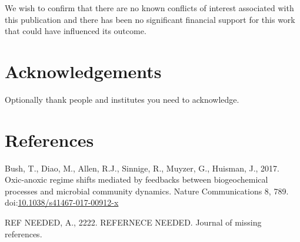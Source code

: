 \documentclass[]{elsarticle} %
\newlength{\cslhangindent}
\newlength{\cslentryspacingunit} %
\newenvironment{CSLReferences}[2] %
 {%
  \setlength{\parindent}{0pt}
  \ifodd #1
  \let\oldpar\par
  \def\par{\hangindent=\cslhangindent\oldpar}
  \fi
  \setlength{\parskip}{#2\cslentryspacingunit}
 }%
 {}
\begin{document}
We wish to confirm that there are no known conflicts of interest
associated with this publication and there has been no significant
financial support for this work that could have influenced its outcome.

\hypertarget{acknowledgements}{%
\section{Acknowledgements}\label{acknowledgements}}

Optionally thank people and institutes you need to acknowledge.

\hypertarget{references}{%
\section*{References}\label{references}}

\hypertarget{refs}{}
\begin{CSLReferences}{1}{0}
\leavevmode{}%
Bush, T., Diao, M., Allen, R.J., Sinnige, R., Muyzer, G., Huisman, J.,
2017. Oxic-anoxic regime shifts mediated by feedbacks between
biogeochemical processes and microbial community dynamics. Nature
Communications 8, 789.
doi:\href{https://doi.org/10.1038/s41467-017-00912-x}{10.1038/s41467-017-00912-x}

\leavevmode{}%
REF NEEDED, A., 2222. {REFERNECE NEEDED}. Journal of missing references.

\end{CSLReferences}
\end{document}
